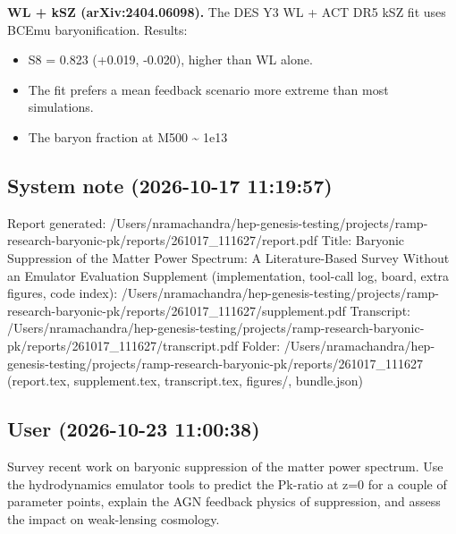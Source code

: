 \documentclass[11pt,a4paper]{article}
\begin{document}
\textbf{WL + kSZ (arXiv:2404.06098).} The DES Y3 WL + ACT DR5 kSZ fit uses BCEmu baryonification. Results:

\begin{itemize}
  \item S8 = 0.823 (+0.019, -0.020), higher than WL alone.
  \item The fit prefers a mean feedback scenario more extreme than most simulations.
  \item The baryon fraction at M500 \textasciitilde{} 1e13
\end{itemize}
\subsection*{System note \small(2026-10-17 11:19:57)}
Report generated: /Users/nramachandra/hep-genesis-testing/projects/ramp-research-baryonic-pk/reports/261017\_111627/report.pdf Title: Baryonic Suppression of the Matter Power Spectrum: A Literature-Based Survey Without an Emulator Evaluation Supplement (implementation, tool-call log, board, extra figures, code index): /Users/nramachandra/hep-genesis-testing/projects/ramp-research-baryonic-pk/reports/261017\_111627/supplement.pdf Transcript: /Users/nramachandra/hep-genesis-testing/projects/ramp-research-baryonic-pk/reports/261017\_111627/transcript.pdf Folder: /Users/nramachandra/hep-genesis-testing/projects/ramp-research-baryonic-pk/reports/261017\_111627 (report.tex, supplement.tex, transcript.tex, figures/, bundle.json)

\subsection*{User \small(2026-10-23 11:00:38)}
Survey recent work on baryonic suppression of the matter power spectrum. Use the hydrodynamics emulator tools to predict the Pk-ratio at z=0 for a couple of parameter points, explain the AGN feedback physics of suppression, and assess the impact on weak-lensing cosmology.
\end{document}

